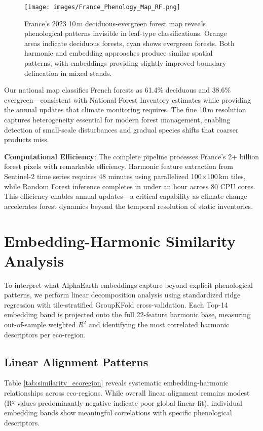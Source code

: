 \documentclass[utf8]{FrontiersinHarvard}
\begin{document}
\begin{figure}[H]
    \centering
    \texttt{[image: images/France\_Phenology\_Map\_RF.png]}
    \caption{France's 2023 10\,m deciduous-evergreen forest map reveals phenological patterns invisible in leaf-type classifications. Orange areas indicate deciduous forests, cyan shows evergreen forests. Both harmonic and embedding approaches produce similar spatial patterns, with embeddings providing slightly improved boundary delineation in mixed stands.}
    \label{fig:national_map}
\end{figure}

Our national map classifies French forests as 61.4\% deciduous and 38.6\% evergreen—consistent with National Forest Inventory estimates while providing the annual updates that climate monitoring requires. The fine 10\,m resolution captures heterogeneity essential for modern forest management, enabling detection of small-scale disturbances and gradual species shifts that coarser products miss.

\textbf{Computational Efficiency}: The complete pipeline processes France's 2+ billion forest pixels with remarkable efficiency. Harmonic feature extraction from Sentinel-2 time series requires 48 minutes using parallelized 100×100\,km tiles, while Random Forest inference completes in under an hour across 80 CPU cores. This efficiency enables annual updates—a critical capability as climate change accelerates forest dynamics beyond the temporal resolution of static inventories.

\section{Embedding-Harmonic Similarity Analysis}

To interpret what AlphaEarth embeddings capture beyond explicit phenological patterns, we perform linear decomposition analysis using standardized ridge regression with tile-stratified GroupKFold cross-validation. Each Top-14 embedding band is projected onto the full 22-feature harmonic base, measuring out-of-sample weighted $R^2$ and identifying the most correlated harmonic descriptors per eco-region.

\subsection{Linear Alignment Patterns}

Table \ref{tab:similarity_ecoregion} reveals systematic embedding-harmonic relationships across eco-regions. While overall linear alignment remains modest (R² values predominantly negative indicate poor global linear fit), individual embedding bands show meaningful correlations with specific phenological descriptors.
\end{document}
